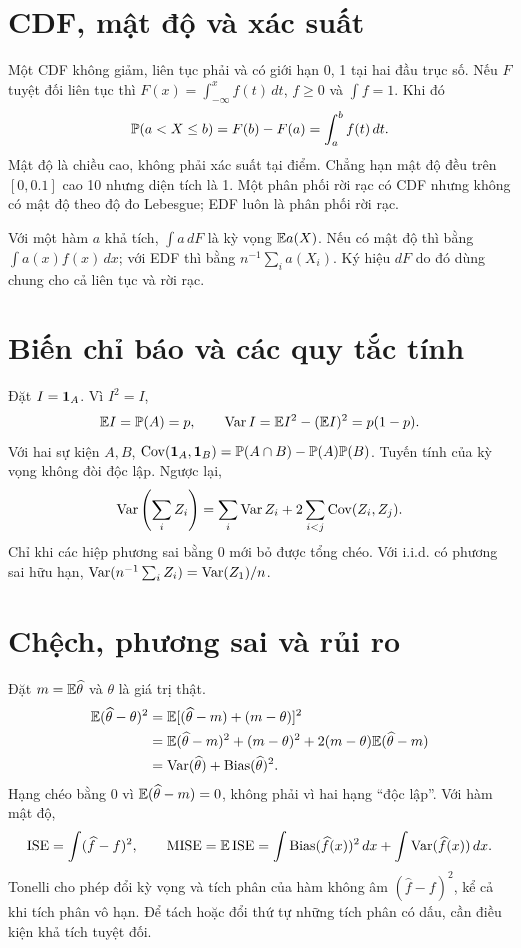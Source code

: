 \section*{CDF, mật độ và xác suất}
Một CDF không giảm, liên tục phải và có giới hạn 0, 1 tại hai đầu trục số.
Nếu $F$ tuyệt đối liên tục thì $F(x)=\int_{-\infty}^x f(t)\,dt$,
$f\geq0$ và $\int f=1$. Khi đó
\[
\mathbb P(a<X\leq b)=F(b)-F(a)=\int_a^bf(t)\,dt.
\]
Mật độ là chiều cao, không phải xác suất tại điểm. Chẳng hạn mật độ đều
trên $[0,0.1]$ cao 10 nhưng diện tích là 1. Một phân phối rời rạc có CDF
nhưng không có mật độ theo độ đo Lebesgue; EDF luôn là phân phối rời rạc.

Với một hàm $a$ khả tích, $\int a\,dF$ là kỳ vọng $\mathbb E a(X)$.
Nếu có mật độ thì bằng $\int a(x)f(x)\,dx$; với EDF thì bằng
$n^{-1}\sum_i a(X_i)$. Ký hiệu $dF$ do đó dùng chung cho cả liên tục và rời rạc.

\section*{Biến chỉ báo và các quy tắc tính}
Đặt $I=\mathbf 1_A$. Vì $I^2=I$,
\[
\mathbb E I=\mathbb P(A)=p,\qquad \operatorname{Var} I=\mathbb E I^2-(\mathbb E I)^2=p(1-p).
\]
Với hai sự kiện $A,B$,
$\operatorname{Cov}(\mathbf 1_A,\mathbf 1_B)=\mathbb P(A\cap B)-\mathbb P(A)\mathbb P(B)$.
Tuyến tính của kỳ vọng không đòi độc lập. Ngược lại,
\[
\operatorname{Var}\left(\sum_iZ_i\right)=\sum_i\operatorname{Var} Z_i+
2\sum_{i<j}\operatorname{Cov}(Z_i,Z_j).
\]
Chỉ khi các hiệp phương sai bằng 0 mới bỏ được tổng chéo.
Với i.i.d. có phương sai hữu hạn,
$\operatorname{Var}(n^{-1}\sum_iZ_i)=\operatorname{Var}(Z_1)/n$.

\section*{Chệch, phương sai và rủi ro}
Đặt $m=\mathbb E\widehat\theta$ và $\theta$ là giá trị thật.
\begin{align*}
\mathbb E(\widehat\theta-\theta)^2
&=\mathbb E[(\widehat\theta-m)+(m-\theta)]^2\\
&=\mathbb E(\widehat\theta-m)^2+(m-\theta)^2
 +2(m-\theta)\mathbb E(\widehat\theta-m)\\
&=\operatorname{Var}(\widehat\theta)+\operatorname{Bias}(\widehat\theta)^2.
\end{align*}
Hạng chéo bằng 0 vì $\mathbb E(\widehat\theta-m)=0$, không phải vì hai hạng
``độc lập''. Với hàm mật độ,
\[
\operatorname{ISE}=\int(\widehat f-f)^2,\qquad
\operatorname{MISE}=\mathbb E\operatorname{ISE}=\int\operatorname{Bias}(\widehat f(x))^2\,dx+
\int\operatorname{Var}(\widehat f(x))\,dx.
\]
Tonelli cho phép đổi kỳ vọng và tích phân của hàm không âm
$(\widehat f-f)^2$, kể cả khi tích phân vô hạn. Để tách hoặc đổi thứ tự
những tích phân có dấu, cần điều kiện khả tích tuyệt đối.

